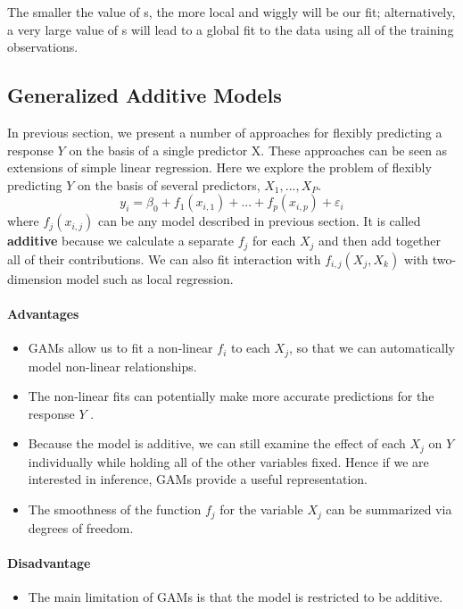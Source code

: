 The smaller the value of s, the more local and wiggly will be our fit; alternatively, a very large value of s will lead to a global fit to the data using all of the training observations.

\subsection{Generalized Additive Models}
In previous section, we present a number of approaches for flexibly predicting a response $Y$ on the basis of a single predictor X. These approaches can be seen as extensions of simple linear regression. Here we explore the problem of flexibly predicting $Y$ on the basis of several predictors, $X_1, ... ,X_P$.
\[ y_i = \beta_0 + f_1(x_{i,1}) + ... + f_p(x_{i,p}) + \varepsilon_i \]
where $f_j(x_{i,j})$ can be any model described in previous section. It is called \textbf{additive} because we calculate a separate $f_j$ for each $X_j$ and then add together all of their contributions.
We can also fit interaction with $f_{i,j}(X_j, X_k)$ with two-dimension model such as local regression.

\paragraph{Advantages}
\begin{itemize}
    \item GAMs allow us to fit a non-linear $f_i$ to each $X_j$, so that we can automatically model non-linear relationships.
    \item The non-linear fits can potentially make more accurate predictions for the response $Y$ .
    \item Because the model is additive, we can still examine the effect of each $X_j$ on $Y$ individually while holding all of the other variables fixed. Hence if we are interested in inference, GAMs provide a useful representation.
    \item The smoothness of the function $f_j$ for the variable $X_j$ can be summarized via degrees of freedom.
\end{itemize}
\paragraph{Disadvantage} 
\begin{itemize}
    \item The main limitation of GAMs is that the model is restricted to be additive. 
\end{itemize}
        

